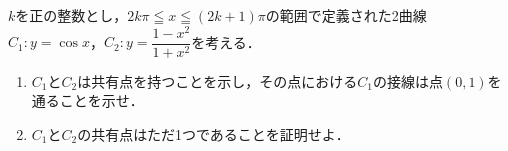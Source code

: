\documentclass[../../main.tex]{subfiles}
\begin{document}
$k$を正の整数とし，$2k\pi \leqq x \leqq (2k+1)\pi$の範囲で定義された2曲線
$C_1:y=\cos x$，$\displaystyle C_2:y=\dfrac{1-x^2}{1+x^2}$を考える．
\begin{enumerate}
  \item $C_1$と$C_2$は共有点を持つことを示し，その点における$C_1$の接線は点$(0,1)$を通ることを示せ．
  \item $C_1$と$C_2$の共有点はただ1つであることを証明せよ．
\end{enumerate}
\end{document}

